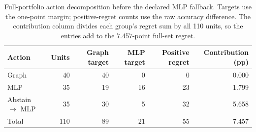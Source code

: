 \begin{table}[ht]
\centering
\caption{Full-portfolio action decomposition before the declared MLP fallback. Targets use the one-point margin; positive-regret counts use the raw accuracy difference. The contribution column divides each group's regret sum by all 110 units, so the entries add to the 7.457-point full-set regret.}
\label{tab:action_confusion}
\small
\setlength{\tabcolsep}{3.5pt}
\begin{tabular}{@{}lrrrrr@{}}
\toprule
Action & Units & Graph target & MLP target & Positive regret & Contribution (pp) \\
\midrule
Graph & 40 & 40 & 0 & 0 & 0.000 \\
MLP & 35 & 19 & 16 & 23 & 1.799 \\
Abstain $\to$ MLP & 35 & 30 & 5 & 32 & 5.658 \\
\midrule
Total & 110 & 89 & 21 & 55 & 7.457 \\
\bottomrule
\end{tabular}
\end{table}
